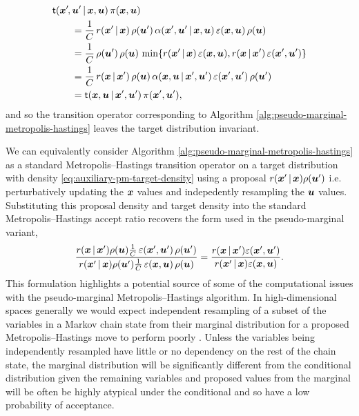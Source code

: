 \begin{equation}
\begin{split}
  &\trans(\vct{x}'\kern-1pt,\vct{u}'\gvn\vct{x},\vct{u}) \, \pi(\vct{x},\vct{u}) \\
  &\qquad=
  \frac{1}{C} \, r(\vct{x}'\gvn\vct{x}) \, \rho(\vct{u}')\, 
  \alpha(\vct{x}',\vct{u}'\gvn\vct{x},\vct{u}) \,
 \esttgtdens(\vct{x},\vct{u})\,\rho(\vct{u})\\
  &\qquad=
  \frac{1}{C} \,\rho(\vct{u}')\,\rho(\vct{u})\, 
  \min\lbr 
    r(\vct{x}'\gvn\vct{x})\,\esttgtdens(\vct{x},\vct{u}),
    r(\vct{x}\gvn\vct{x}')\,\esttgtdens(\vct{x}',\vct{u}')
  \rbr
  \\
  &\qquad=
  \frac{1}{C} \, r(\vct{x}\gvn\vct{x}') \, \rho(\vct{u})\, 
  \alpha(\vct{x},\vct{u}\gvn\vct{x}',\vct{u}') \,
 \esttgtdens(\vct{x}',\vct{u}')\,\rho(\vct{u}')\\
 &\qquad=
 \trans(\vct{x},\vct{u}\gvn\vct{x}',\vct{u}') \, \pi(\vct{x}',\vct{u}'),
\end{split}
\end{equation}
and so the transition operator corresponding to Algorithm \ref{alg:pseudo-marginal-metropolis-hastings} leaves the target distribution invariant. 

We can equivalently consider Algorithm \ref{alg:pseudo-marginal-metropolis-hastings} as a standard Metropolis--Hastings transition operator on a target distribution with density  \eqref{eq:auxiliary-pm-target-density} using a proposal $r(\boldsymbol{x}'\operatorname{|}\boldsymbol{x})\rho(\boldsymbol{u}')$ i.e. perturbatively updating the $\boldsymbol{x}$ values and indepedently resampling the $\boldsymbol{u}$ values. Substituting this proposal density and target density into the standard Metropolis--Hastings accept ratio recovers the form used in the pseudo-marginal variant,
\begin{equation}
\frac
  {r(\boldsymbol{x}\operatorname{|}\boldsymbol{x}')\rho(\boldsymbol{u})  \frac{1}{C} \,\varepsilon(\boldsymbol{x}',\boldsymbol{u}')\,\rho(\boldsymbol{u}')}
  {r(\boldsymbol{x}'\operatorname{|}\boldsymbol{x})\rho(\boldsymbol{u}')  \frac{1}{C} \,\varepsilon(\boldsymbol{x},\boldsymbol{u})\,\rho(\boldsymbol{u})}
  =
\frac
  {r(\boldsymbol{x}\operatorname{|}\boldsymbol{x}')\varepsilon(\boldsymbol{x}',\boldsymbol{u}')}
  {r(\boldsymbol{x}'\operatorname{|}\boldsymbol{x})\varepsilon(\boldsymbol{x},\boldsymbol{u})}.
\end{equation}
This formulation highlights a potential source of some of the computational issues with the pseudo-marginal Metropolis--Hastings algorithm. In high-dimensional spaces generally we would expect independent resampling of a subset of the variables in a Markov chain state from their marginal distribution for a proposed Metropolis--Hastings move to perform poorly \citep{neal2015optimal}. Unless the variables being independently resampled have little or no dependency on the rest of the chain state, the marginal distribution will be significantly different from the conditional distribution given the remaining variables and proposed values from the marginal will be often be highly atypical under the conditional and so have a low probability of acceptance.

